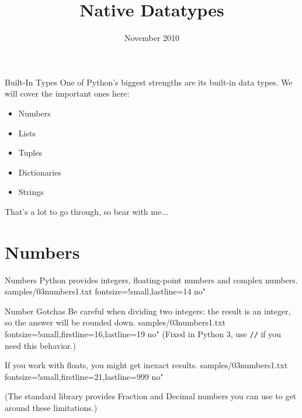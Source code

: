 \documentclass[reference]{pyslides}
\title{Native Datatypes}
\date{November 2010}
\begin{document}
\begin{frame}\titlepage\end{frame}

\section{}

\begin{frame}[fragile]{Built-In Types}
One of Python's biggest strengths are its built-in data types. We will cover the important ones here:
\begin{itemize}
\item Numbers
\item Lists
\item Tuples
\item Dictionaries
\item Strings
\end{itemize}

\bigskip

That's a lot to go through, so bear with me...

\end{frame}

\section{Numbers}

\begin{frame}[fragile]{Numbers}
Python provides integers, floating-point numbers and complex numbers.
 samples/03numbers1.txt fontsize=!small,lastline=14 no"
\end{frame}

\begin{frame}[fragile]{Number Gotchas}
Be careful when dividing two integers: the result is an integer, so the answer will be rounded down.
 samples/03numbers1.txt fontsize=!small,firstline=16,lastline=19 no"
(Fixed in Python 3, use \verb+//+ if you need this behavior.)

\bigskip

If you work with floats, you might get inexact results.
 samples/03numbers1.txt fontsize=!small,firstline=21,lastline=999 no"

\bigskip

{\small (The standard library provides Fraction and Decimal numbers you can use to get around these limitations.)}
\end{frame}
\end{document}
